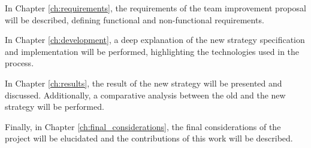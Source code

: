 In Chapter \ref{ch:requirements}, the requirements of the team improvement proposal will be described, defining functional and non-functional requirements.

In Chapter \ref{ch:development}, a deep explanation of the new strategy specification and implementation will be performed, highlighting the technologies used in the process.

In Chapter \ref{ch:results}, the result of the new strategy will be presented and discussed. Additionally, a comparative analysis between the old and the new strategy will be performed.

Finally, in Chapter \ref{ch:final_considerations}, the final considerations of the project will be elucidated and the contributions of this work will be described.
